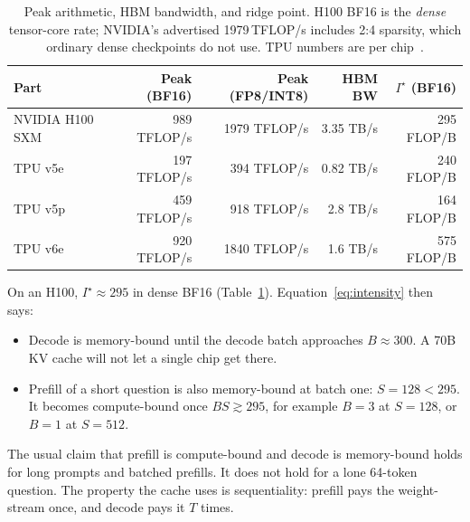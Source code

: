 \begin{table}[t]
\centering
\caption{Peak arithmetic, HBM bandwidth, and ridge point. H100 BF16 is the \emph{dense} tensor-core rate; NVIDIA's advertised 1979\,TFLOP/s includes 2:4 sparsity, which ordinary dense checkpoints do not use. TPU numbers are per chip~\citep{austin2025scaling}.}
\label{tab:hw}
\small
\begin{tabular}{@{}lrrrr@{}}
\toprule
Part & Peak (BF16) & Peak (FP8/INT8) & HBM BW & $I^\star$ (BF16) \\
\midrule
NVIDIA H100 SXM & 989 TFLOP/s & 1979 TFLOP/s & 3.35 TB/s & 295 FLOP/B \\
TPU v5e & 197 TFLOP/s & 394 TFLOP/s & 0.82 TB/s & 240 FLOP/B \\
TPU v5p & 459 TFLOP/s & 918 TFLOP/s & 2.8 TB/s & 164 FLOP/B \\
TPU v6e & 920 TFLOP/s & 1840 TFLOP/s & 1.6 TB/s & 575 FLOP/B \\
\bottomrule
\end{tabular}
\end{table}

On an H100, $I^\star\approx 295$ in dense BF16 (Table~\ref{tab:hw}). Equation~\eqref{eq:intensity} then says:
\begin{itemize}
  \item Decode is memory-bound until the decode batch approaches $B\approx 300$. A 70B KV cache will not let a single chip get there.
  \item Prefill of a short question is also memory-bound at batch one: $S=128<295$. It becomes compute-bound once $BS\gtrsim 295$, for example $B=3$ at $S=128$, or $B=1$ at $S=512$.
\end{itemize}
The usual claim that prefill is compute-bound and decode is memory-bound holds for long prompts and batched prefills. It does not hold for a lone 64-token question. The property the cache uses is sequentiality: prefill pays the weight-stream once, and decode pays it $T$ times.

